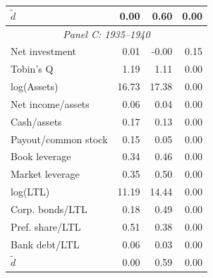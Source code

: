\begin{threeparttable}
\begin{tabular}{lrrr}
\ensuremath{\tilde{d}} & 0.00 & 0.60 & 0.00 \\
\midrule
\multicolumn{4}{c}{\textit{Panel C: 1935--1940}} \\
\midrule
Net investment & 0.01 & -0.00 & 0.15 \\
Tobin's Q & 1.19 & 1.11 & 0.00 \\
log(Assets) & 16.73 & 17.38 & 0.00 \\
Net income/assets & 0.06 & 0.04 & 0.00 \\
Cash/assets & 0.17 & 0.13 & 0.00 \\
Payout/common stock & 0.15 & 0.05 & 0.00 \\
Book leverage & 0.34 & 0.46 & 0.00 \\
Market leverage & 0.35 & 0.50 & 0.00 \\
log(LTL) & 11.19 & 14.44 & 0.00 \\
Corp. bonds/LTL & 0.18 & 0.49 & 0.00 \\
Pref. share/LTL & 0.51 & 0.38 & 0.00 \\
Bank debt/LTL & 0.06 & 0.03 & 0.00 \\
\ensuremath{\tilde{d}} & 0.00 & 0.59 & 0.00 \\
\bottomrule\end{tabular}\end{threeparttable}
